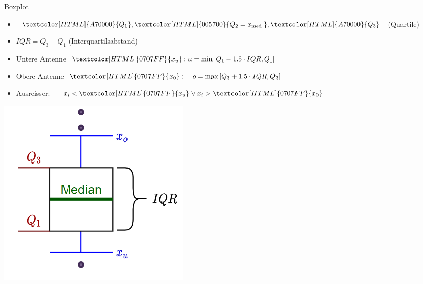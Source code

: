 \begin{definition}{Boxplot}
\vspace{-1mm}\\
\begin{minipage}{0.62\columnwidth}
\begin{itemize}
  \setlength{\itemsep}{1pt}
  \item $\textcolor[HTML]{A70000}{Q_{1}},\textcolor[HTML]{005700}{ Q_{2}=x_{\text {med }}},\textcolor[HTML]{A70000}{ Q_{3}}$ (Quartile)
  \item $I Q R=Q_{3}-Q_{1}$ (Interquartilsabstand)
  \item Untere Antenne $\textcolor[HTML]{0707FF}{x_{u}}:\\ u=\min \left[Q_{1}-1.5 \cdot I Q R, Q_{1}\right]$
  \item Obere Antenne $\textcolor[HTML]{0707FF}{x_{0}}:\\ \quad o=\max \left[Q_{3}+1.5 \cdot I Q R, Q_{3}\right]$
  \item Ausreisser: $\quad x_{i}<\textcolor[HTML]{0707FF}{x_{u}} \vee x_{i}>\textcolor[HTML]{0707FF}{x_{0}}$
\end{itemize}
\end{minipage}
\begin{minipage}{0.35\columnwidth}
  \includegraphics[width=\textwidth]{images/boxplot.png}
\end{minipage}
\end{definition}

